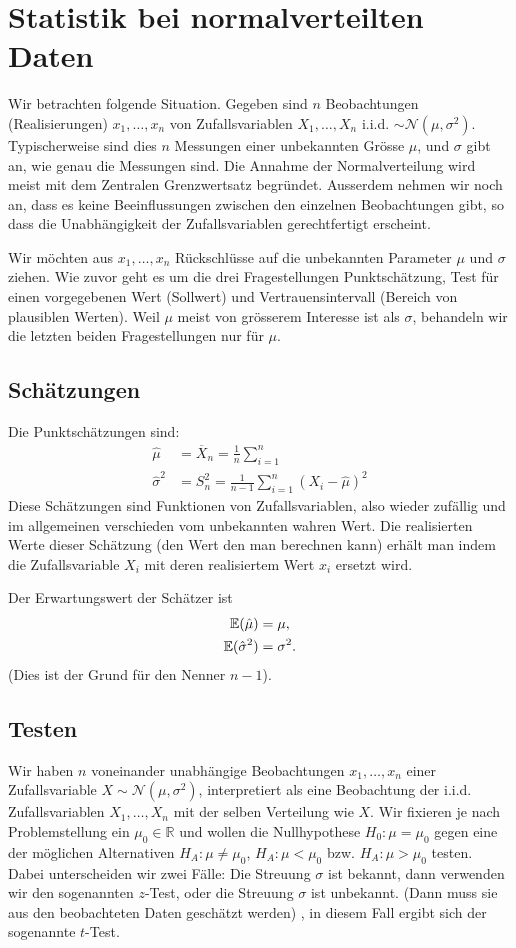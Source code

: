 \chapter{Statistik bei normalverteilten Daten}
Wir betrachten folgende Situation. Gegeben sind $n$ Beobachtungen (Realisierungen) $x_1,\ldots,x_n$ von Zufallsvariablen $X_1,\ldots,X_n$ i.i.d. $\sim \mathcal{N}(\mu,\sigma^2)$. Typischerweise sind dies $n$ Messungen einer unbekannten Grösse $\mu$, und $\sigma$ gibt an, wie genau die Messungen sind. Die Annahme der Normalverteilung wird meist mit dem Zentralen Grenzwertsatz begründet. Ausserdem nehmen wir noch an, dass es keine Beeinflussungen zwischen den einzelnen Beobachtungen gibt, so dass die Unabhängigkeit der Zufallsvariablen gerechtfertigt erscheint.

Wir möchten aus $x_1,\ldots,x_n$ Rückschlüsse auf die unbekannten Parameter $\mu$ und $\sigma$ ziehen. Wie zuvor geht es um die drei Fragestellungen Punktschätzung, Test für einen vorgegebenen Wert (Sollwert) und Vertrauensintervall (Bereich von plausiblen Werten). Weil $\mu$ meist von grösserem Interesse ist als $\sigma$, behandeln wir die letzten beiden Fragestellungen nur für $\mu$.
\section{Schätzungen}
Die Punktschätzungen sind:
\begin{align}
	\hat{\mu}&=\overline{X}_n=\frac{1}{n}\sum_{i=1}^{n}\\
	\hat{\sigma}^2&=S_{n}^{2}=\frac{1}{n-1}\sum_{i=1}^{n}\left( X_i-\hat{\mu} \right)^2
	\label{eq:schaetzer}
\end{align}
Diese Schätzungen sind Funktionen von Zufallsvariablen, also wieder zufällig und im allgemeinen verschieden vom unbekannten wahren Wert. Die realisierten Werte dieser Schätzung (den Wert den man berechnen kann) erhält man indem die Zufallsvariable $X_i$ mit deren realisiertem Wert $x_i$ ersetzt wird.

Der Erwartungswert der Schätzer ist
\begin{align*}
	\operatorname{\mathbb E}(\hat{\mu})&=\mu,\\
	\operatorname{\mathbb E}(\hat{\sigma}^2)&=\sigma^2.
\end{align*}
(Dies ist der Grund für den Nenner $n-1$).
\section{Testen}
\label{sec9.2}
Wir haben $n$ voneinander unabhängige Beobachtungen $x_1,\ldots,x_n$ einer Zufallsvariable $X\sim \mathcal{N}(\mu,\sigma^2)$, interpretiert als eine Beobachtung der i.i.d. Zufallsvariablen $X_1,\ldots,X_n$ mit der selben Verteilung wie $X$. Wir fixieren je nach Problemstellung ein $\mu_0\in\mathbb{R}$ und wollen die Nullhypothese $H_0:\mu=\mu_0$ gegen eine der möglichen Alternativen $H_A:\mu\neq \mu_0$, $H_A:\mu<\mu_0$ bzw. $H_A:\mu>\mu_0$ testen. Dabei unterscheiden wir zwei Fälle: Die Streuung $\sigma$ ist bekannt, dann verwenden wir den sogenannten $z$-Test, oder die Streuung $\sigma$ ist unbekannt. (Dann muss sie aus den beobachteten Daten geschätzt werden) , in diesem Fall ergibt sich der sogenannte $t$-Test.
